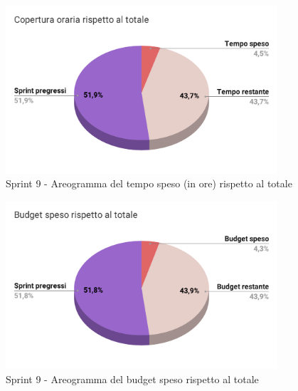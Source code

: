   \begin{figure}[H]
    \centering
    \includegraphics[width=0.90\textwidth]{assets/Consuntivo/Sprint-9/copertura_oraria.pdf}
    \caption{Sprint 9 - Areogramma del tempo speso (in ore) rispetto al totale}
  \end{figure}

  \begin{figure}[H]
    \centering
    \includegraphics[width=0.90\textwidth]{assets/Consuntivo/Sprint-9/budget_speso.pdf}
    \caption{Sprint 9 - Areogramma del budget speso rispetto al totale}
  \end{figure}

